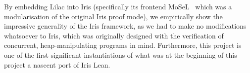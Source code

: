 By embedding Lilac into Iris (specifically its frontend MoSeL~\cite{mosel} which was a modularisation of the original Iris proof mode),
we empirically show the impressive generality of the Iris framework, as we had to make
no modifications whatsoever to Iris, which was originally designed with the verification of concurrent, heap-manipulating programs in mind. Furthermore, this project is one of the first significant instantiations
of what was at the beginning of this project a nascent port of Iris Lean.